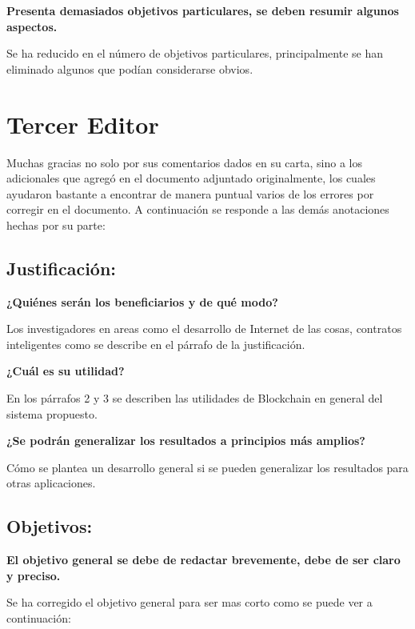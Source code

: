 \documentclass[10pt,a4paper,roman]{moderncv}        %
\begin{document}
\hfill \break
\textbf{Presenta demasiados objetivos particulares, se deben resumir algunos aspectos.}

Se ha reducido en el número de objetivos particulares, principalmente se han eliminado algunos que podían considerarse obvios.


\section*{Tercer Editor}


Muchas gracias no solo por sus comentarios dados en su carta, sino a los adicionales que agregó en el documento adjuntado originalmente, los cuales ayudaron bastante a encontrar de manera puntual varios de los errores por corregir en el documento. A continuación se responde a las demás anotaciones hechas por su parte:


\subsection{Justificación:}

\textbf{¿Quiénes serán los beneficiarios y de qué modo?}


\hfill \break
Los investigadores en areas como el desarrollo de Internet de las cosas, contratos inteligentes como se describe en el párrafo de la justificación.

\hfill \break
\textbf{¿Cuál es su utilidad?}

En los párrafos 2 y 3 se describen las utilidades de Blockchain en general del sistema propuesto.

\hfill \break
\textbf{¿Se podrán generalizar los resultados a principios más amplios?}

\hfill \break
Cómo se plantea un desarrollo general si se pueden generalizar los resultados para otras aplicaciones.

\hfill \break
\subsection{Objetivos:}

\textbf{El objetivo general se debe de redactar brevemente, debe de ser claro y preciso.}

\hfill \break
Se ha corregido el objetivo general para ser mas corto como se puede ver a continuación:
 
\end{document}
